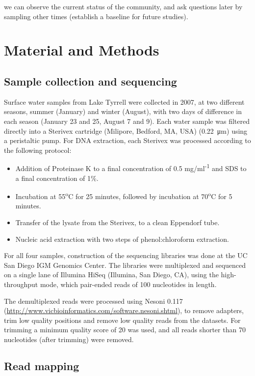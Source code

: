 we can observe the current status of the community, and ask questions later by sampling other times (establish a baseline for future studies).

\section{Material and Methods}

\subsection{Sample collection and sequencing}
Surface water samples from Lake Tyrrell were collected in 2007, at two different seasons, summer (January) and winter (August), with two days of difference in each season (January 23 and 25, August 7 and 9). Each water sample was filtered directly into a Sterivex cartridge (Milipore, Bedford, MA, USA) (\SI{0.22}{\micro\meter}) using a peristaltic pump. For DNA extraction, each Sterivex was processed according to the following protocol:

\begin{itemize}
\item Addition of Proteinase K to a final concentration of 0.5 mg/ml\textsuperscript{-1} and SDS to a final concentration of 1\%.
\item Incubation at 55\textsuperscript{o}C for 25 minutes, followed by incubation at 70\textsuperscript{o}C for 5 minutes.
\item Transfer of the lysate from the Sterivex, to a clean Eppendorf tube.
\item Nucleic acid extraction with two steps of phenol:chloroform extraction. 
\end{itemize}

For all four samples, construction of the sequencing libraries was done at the UC San Diego IGM Genomics Center. The libraries were multiplexed and sequenced on a single lane of Illumina HiSeq (Illumina, San Diego, CA), using the high-throughput mode, which pair-ended reads of 100 nucleotides in length.

The demultiplexed reads were processed using Nesoni 0.117 (\url{http://www.vicbioinformatics.com/software.nesoni.shtml}), to remove adapters, trim low quality positions and remove low quality reads from the datasets. For trimming a minimum quality score of 20 was used, and all reads shorter than 70 nucleotides (after trimming) were removed.

\subsection{Read mapping}

